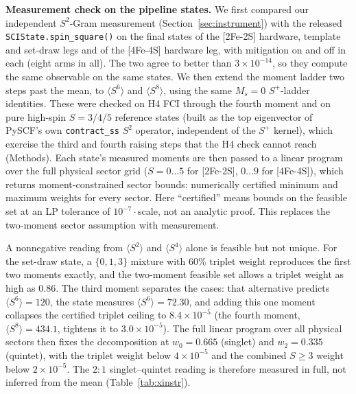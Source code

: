 \documentclass[11pt]{article}
\newcommand{\ssq}{\ensuremath{\langle S^2\rangle}}
\begin{document}
\textbf{Measurement check on the pipeline states.} We first compared our independent $S^2$-Gram measurement (Section~\ref{sec:instrument}) with the released \texttt{SCIState.spin\_square()} on the final states of the [2Fe-2S] hardware, template and set-draw legs and of the [4Fe-4S] hardware leg, with mitigation on and off in each (eight arms in all). The two agree to better than $3\times10^{-14}$, so they compute the same observable on the same states. We then extend the moment ladder two steps past the mean, to $\langle S^6\rangle$ and $\langle S^8\rangle$, using the same $M_s=0$ $S^+$-ladder identities. These were checked on H4 FCI through the fourth moment and on pure high-spin $S = 3/4/5$ reference states (built as the top eigenvector of PySCF's own \texttt{contract\_ss} $S^2$ operator, independent of the $S^+$ kernel), which exercise the third and fourth raising steps that the H4 check cannot reach (Methods). Each state's measured moments are then passed to a linear program over the full physical sector grid ($S = 0\ldots5$ for [2Fe-2S], $0\ldots9$ for [4Fe-4S]), which returns moment-constrained sector bounds: numerically certified minimum and maximum weights for every sector. Here ``certified'' means bounds on the feasible set at an LP tolerance of $10^{-7}\cdot$scale, not an analytic proof. This replaces the two-moment sector assumption with measurement.

A nonnegative reading from $\ssq$ and $\langle S^4\rangle$ alone is feasible but not unique. For the set-draw state, a $\{0,1,3\}$ mixture with 60\% triplet weight reproduces the first two moments exactly, and the two-moment feasible set allows a triplet weight as high as 0.86. The third moment separates the cases: that alternative predicts $\langle S^6\rangle = 120$, the state measures $\langle S^6\rangle = 72.30$, and adding this one moment collapses the certified triplet ceiling to $8.4\times10^{-5}$ (the fourth moment, $\langle S^8\rangle = 434.1$, tightens it to $3.0\times10^{-5}$). The full linear program over all physical sectors then fixes the decomposition at $w_0 = 0.665$ (singlet) and $w_2 = 0.335$ (quintet), with the triplet weight below $4\times10^{-5}$ and the combined $S\ge3$ weight below $2\times10^{-5}$. The $2{:}1$ singlet--quintet reading is therefore measured in full, not inferred from the mean (Table~\ref{tab:xinstr}).
\end{document}
